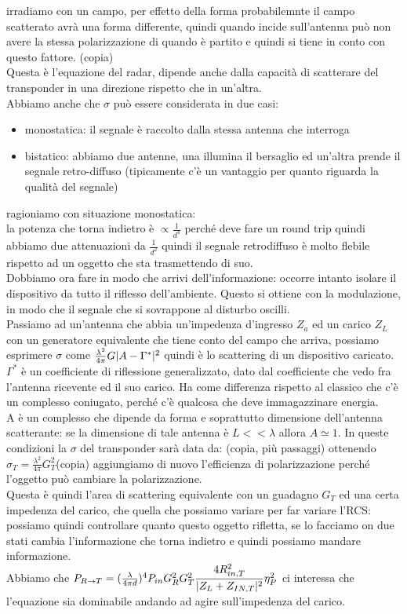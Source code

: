 \documentclass[oneside, 12pt]{extbook}
\DeclarePairedDelimiter{\abs}{\lvert}{\rvert}
\begin{document}
irradiamo con un campo, per effetto della forma probabilemnte il campo scatterato avrà una forma differente, quindi quando incide sull'antenna può non avere la stessa polarizzazione di quando è partito e quindi si tiene in conto con questo fattore. (copia)\\Questa è l'equazione del radar, dipende anche dalla capacità di scatterare del transponder in una direzione rispetto che in un'altra.\\Abbiamo anche che $\sigma$ può essere considerata in due casi:
\begin{itemize}
	\item monostatica: il segnale è raccolto dalla stessa antenna che interroga
	\item bistatico: abbiamo due antenne, una illumina il bersaglio ed un'altra prende il segnale retro-diffuso (tipicamente c'è un vantaggio per quanto riguarda la qualità del segnale)
\end{itemize}
ragioniamo con situazione monostatica:\\la potenza che torna indietro è $\propto \frac{1}{d^4}$ perché deve fare un round trip quindi abbiamo due attenuazioni da $\frac{1}{d^2}$ quindi il segnale retrodiffuso è molto flebile rispetto ad un oggetto che sta trasmettendo di suo.\\Dobbiamo ora fare in modo che arrivi dell'informazione: occorre intanto isolare il dispositivo da tutto il riflesso dell'ambiente. Questo si ottiene con la modulazione, in modo che il segnale che si sovrappone al disturbo oscilli.\\Passiamo ad un'antenna che abbia un'impedenza d'ingresso $Z_a$ ed un carico $Z_L$ con un generatore equivalente che tiene conto del campo che arriva, possiamo esprimere $\sigma$ come $\frac{\lambda^2}{4 \pi} G \abs{A - \Gamma^*}^2$ quindi è lo scattering di un dispositivo caricato.\\$\Gamma^*$ è un coefficiente di riflessione generalizzato, dato dal coefficiente che vedo fra l'antenna ricevente ed il suo carico. Ha come differenza rispetto al classico che c'è un complesso coniugato, perché c'è qualcosa che deve immagazzinare energia.\\ A è un complesso che dipende da forma e soprattutto dimensione dell'antenna scatterante: se la dimensione di tale antenna è $L << \lambda$ allora $A \simeq 1$. In queste condizioni la $\sigma$ del transponder sarà data da: (copia, più passaggi) ottenendo $\sigma_T = \frac{\lambda^2}{4 \pi} G_T^2 $(copia) aggiungiamo di nuovo l'efficienza di polarizzazione perché l'oggetto può cambiare la polarizzazione.\\Questa è quindi l'area di scattering equivalente con un guadagno $G_T$ ed una certa impedenza del carico, che  quella che possiamo variare per far variare l'RCS: possiamo quindi controllare quanto questo oggetto rifletta, se lo facciamo on due stati cambia l'informazione che torna indietro e quindi possiamo mandare informazione.\\Abbiamo che $P_{R \rightarrow T} = (\frac{\lambda}{4 \pi d})^4 P_{in} G_R^2 G_T^2 \dfrac{4 R_{in,T}^2}{\abs{Z_L + Z_{IN,T}}^2} \eta_P^2$ ci interessa che l'equazione sia dominabile andando ad agire sull'impedenza del carico.
\end{document}
